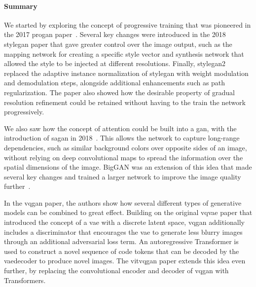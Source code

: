 \paragraph{Summary}

We started by exploring the concept of progressive training that was pioneered in the 2017 \gls{progan} paper~\cite{Karras2018Feb}.
Several key changes were introduced in the 2018 \gls{stylegan} paper that gave greater control over the image output, such as the mapping network for creating a specific style vector and synthesis network that allowed the style to be injected at different resolutions.
Finally, \gls{stylegan}2 replaced the adaptive instance normalization of \gls{stylegan} with weight modulation and demodulation steps, alongside additional enhancements such as path regularization.
The paper also showed how the desirable property of gradual resolution refinement could be retained without having to the train the network progressively.

We also saw how the concept of attention could be built into a \gls{gan}, with the introduction of \gls{sagan} in 2018~\cite{zhang2019selfattention}.
This allows the network to capture long-range dependencies, such as similar background colors over opposite sides of an image, without relying on deep convolutional maps to spread the information over the spatial dimensions of the image.
BigGAN was an extension of this idea that made several key changes and trained a larger network to improve the image quality further~\cite{brock2019large}.

In the \gls{vqgan} paper, the authors show how several different types of generative models can be combined to great effect.
Building on the original \gls{vqvae} paper that introduced the concept of a \gls{vae} with a discrete latent space, \gls{vqgan} additionally includes a discriminator that encourages the \gls{vae} to generate less blurry images through an additional adversarial loss term.
An autoregressive Transformer is used to construct a novel sequence of code tokens that can be decoded by the \gls{vae}decoder to produce novel images.
The \gls{vitvqgan} paper extends this idea even further, by replacing the convolutional encoder and decoder of \gls{vqgan} with Transformers.





